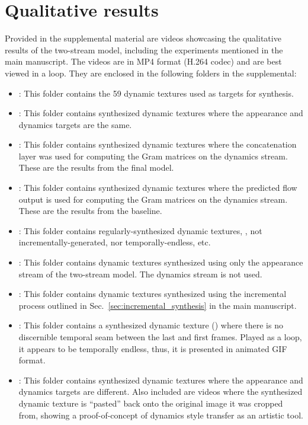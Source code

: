 \section{Qualitative results}
Provided in the supplemental material are videos showcasing the qualitative results of the two-stream model, including the experiments mentioned in the main manuscript. The videos are in MP4 format (H.264 codec) and are best viewed in a loop. They are enclosed in the following folders in the supplemental:
\begin{itemize}
	\item {}: This folder contains the 59 dynamic textures used as targets for synthesis.
	\item {}: This folder contains synthesized dynamic textures where the appearance and dynamics targets are the same.
	\item {}: This folder contains synthesized dynamic textures where the concatenation layer was used for computing the Gram matrices on the dynamics stream. These are the results from the final model.
	\item {}: This folder contains synthesized dynamic textures where the predicted flow output is used for computing the Gram matrices on the dynamics stream. These are the results from the baseline.
	\item {}: This folder contains regularly-synthesized dynamic textures, \ie, not incrementally-generated, nor temporally-endless, etc.
	\item {}: This folder contains dynamic textures synthesized using only the appearance stream of the two-stream model. The dynamics stream is not used.
	\item {}: This folder contains dynamic textures synthesized using the incremental process outlined in Sec.\ \ref{sec:incremental_synthesis} in the main manuscript.
	\item {}: This folder contains a synthesized dynamic texture () where there is no discernible temporal seam between the last and first frames. Played as a loop, it appears to be temporally endless, thus, it is presented in animated GIF format.
	\item {}: This folder contains synthesized dynamic textures where the appearance and dynamics targets are different. Also included are videos where the synthesized dynamic texture is ``pasted'' back onto the original image it was cropped from, showing a proof-of-concept of dynamics style transfer as an artistic tool.

\end{itemize}
